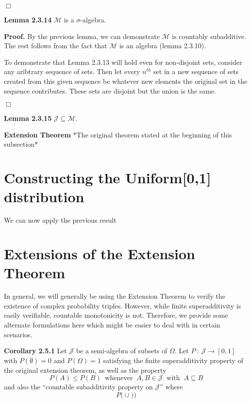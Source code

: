 \documentclass{article}
\begin{document}
\hfill $\Box$

\medskip

\noindent \textbf{Lemma 2.3.14} $\mathcal{M}$ is a $\sigma$-algebra. 

\medskip

\noindent \textbf{Proof.} By the previous lemma, we can demonstrate $\mathcal{M}$ is countably subadditive. The rest follows from the fact that $\mathcal{M}$ is an algebra (lemma 2.3.10).

To demonstrate that Lemma 2.3.13 will hold even for non-disjoint sets, consider any aribtrary sequence of sets. Then let every $n^{th}$ set in a new sequence of sets created from this given sequence be whatever new elements the original set in the sequence contributes. These sets are disjoint but the union is the same. 

\hfill $\Box$

\medskip

\noindent \textbf{Lemma 2.3.15} $\mathcal{J} \subseteq \mathcal{M}$. 



\medskip

\noindent \textbf{Extension Theorem} *The original theorem stated at the beginning of this subsection*


\section{Constructing the Uniform[0,1] distribution}

We can now apply the previous result 


\section{Extensions of the Extension Theorem}

In general, we will generally be using the Extension Theorem to verify the existence of complex probability triples. However, while finite superadditivity is easily verifiable, countable monotonicity is not. Therefore, we provide some alternate formulations here which might be easier to deal with in certain scenarios. 

\bigskip

\noindent \textbf{Corollary 2.5.1} Let $\mathcal{J}$ be a semi-algebra of subsets of $\Omega$. Let $P \: : \: \mathcal{J} \to [0,1]$ with $P(\emptyset) = 0$ and $P(\Omega) = 1$ satisfying the finite superadditivity property of the original extension theorem, as well as the property \[P(A) \leq P(B) \;\; \text{whenever} \;\; A,B \in \mathcal{J} \;\; \text{with} \;\; A \subseteq B\] and also the ``countable subadditivity property on $\mathcal{J}$'' where \[P\Big(\cup_{} )\Big) \]
\end{document}
